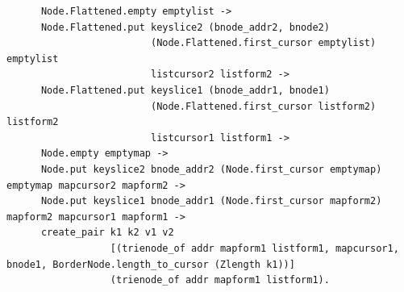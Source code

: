 \documentclass[runningheads]{llncs}
\begin{document}
\begin{verbatim}
      Node.Flattened.empty emptylist ->
      Node.Flattened.put keyslice2 (bnode_addr2, bnode2)
                         (Node.Flattened.first_cursor emptylist) emptylist
                         listcursor2 listform2 ->
      Node.Flattened.put keyslice1 (bnode_addr1, bnode1)
                         (Node.Flattened.first_cursor listform2) listform2
                         listcursor1 listform1 ->
      Node.empty emptymap ->
      Node.put keyslice2 bnode_addr2 (Node.first_cursor emptymap) emptymap mapcursor2 mapform2 ->
      Node.put keyslice1 bnode_addr1 (Node.first_cursor mapform2) mapform2 mapcursor1 mapform1 ->
      create_pair k1 k2 v1 v2
                  [(trienode_of addr mapform1 listform1, mapcursor1, bnode1, BorderNode.length_to_cursor (Zlength k1))]
                  (trienode_of addr mapform1 listform1).


\end{verbatim}
\end{document}

